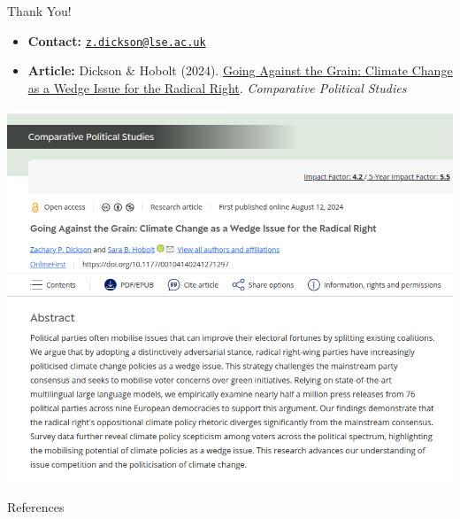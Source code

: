 \documentclass[
  ignorenonframetext,
]{beamer}
\providecommand{\tightlist}{%
  \setlength{\itemsep}{0pt}\setlength{\parskip}{0pt}}\usepackage{longtable,booktabs,array}
\newlength{\cslhangindent}
\newenvironment{CSLReferences}[2] %
 {\begin{list}{}{%
  \setlength{\itemindent}{0pt}
  \setlength{\leftmargin}{0pt}
  \setlength{\parsep}{0pt}
  \ifodd #1
   \setlength{\leftmargin}{\cslhangindent}
   \setlength{\itemindent}{-1\cslhangindent}
  \fi
  \setlength{\itemsep}{#2\baselineskip}}}
 {\end{list}}
\begin{document}
\begin{frame}{Thank You!}
\label{thank-you}
\begin{itemize}
\tightlist
\item
  \textbf{Contact:}
  \href{mailto:z.dickson@lse.ac.uk}{\nolinkurl{z.dickson@lse.ac.uk}}
\item
  \textbf{Article:} Dickson \& Hobolt (2024).
  \href{https://journals.sagepub.com/doi/10.1177/00104140241271297}{Going
  Against the Grain: Climate Change as a Wedge Issue for the Radical
  Right}. \emph{Comparative Political Studies}
\end{itemize}

\begin{center}
\includegraphics[width=0.5\linewidth,height=\textheight,keepaspectratio]{images/CPS_abstract.png}
\end{center}
\end{frame}

\begin{frame}{References}
\label{references}
\label{refs}
\begin{CSLReferences}{0}{1}
\end{CSLReferences}
\end{frame}
\end{document}
